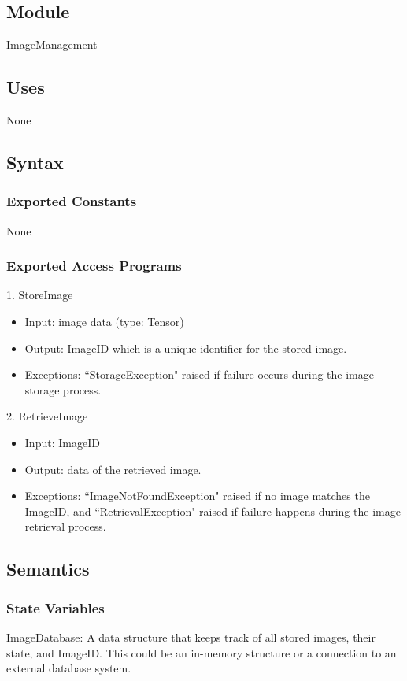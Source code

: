 \documentclass[12pt, titlepage]{article}
\begin{document}
\subsection{Module}

ImageManagement

\subsection{Uses}
None

\subsection{Syntax}

\subsubsection{Exported Constants}
None

\subsubsection{Exported Access Programs}
1. StoreImage
\begin{itemize}
    \item Input: image data (type: Tensor)
    \item Output: ImageID which is a unique identifier for the stored image.
    \item Exceptions: ``StorageException" raised if failure occurs during the image storage process.
\end{itemize}

2. RetrieveImage
\begin{itemize}
    \item Input: ImageID
    \item Output: data of the retrieved image.
    \item Exceptions: ``ImageNotFoundException" raised if no image matches the ImageID, and ``RetrievalException" raised if failure happens during the image retrieval process.
\end{itemize}



\subsection{Semantics}

\subsubsection{State Variables}
ImageDatabase: A data structure that keeps track of all stored images, their state, and ImageID. This could be an in-memory structure or a connection to an external database system.
\end{document}
